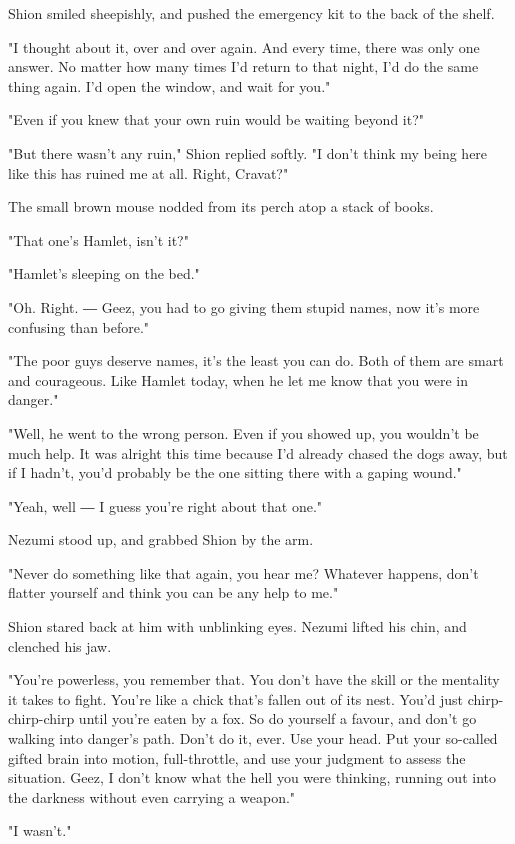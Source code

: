 Shion smiled sheepishly, and pushed the emergency kit to the back of the
shelf.

"I thought about it, over and over again. And every time, there was only
one answer. No matter how many times I'd return to that night, I'd do
the same thing again. I'd open the window, and wait for you."

"Even if you knew that your own ruin would be waiting beyond it?"

"But there wasn't any ruin," Shion replied softly. "I don't think my
being here like this has ruined me at all. Right, Cravat?"

The small brown mouse nodded from its perch atop a stack of books.

"That one's Hamlet, isn't it?"

"Hamlet's sleeping on the bed."

"Oh. Right. ― Geez, you had to go giving them stupid names, now it's
more confusing than before."

"The poor guys deserve names, it's the least you can do. Both of them
are smart and courageous. Like Hamlet today, when he let me know that
you were in danger."

"Well, he went to the wrong person. Even if you showed up, you wouldn't
be much help. It was alright this time because I'd already chased the
dogs away, but if I hadn't, you'd probably be the one sitting there with
a gaping wound."

"Yeah, well ― I guess you're right about that one."

Nezumi stood up, and grabbed Shion by the arm.

"Never do something like that again, you hear me? Whatever happens,
don't flatter yourself and think you can be any help to me."

Shion stared back at him with unblinking eyes. Nezumi lifted his chin,
and clenched his jaw.

"You're powerless, you remember that. You don't have the skill or the
mentality it takes to fight. You're like a chick that's fallen out of
its nest. You'd just chirp-chirp-chirp until you're eaten by a fox. So
do yourself a favour, and don't go walking into danger's path. Don't do
it, ever. Use your head. Put your so-called gifted brain into motion,
full-throttle, and use your judgment to assess the situation. Geez, I
don't know what the hell you were thinking, running out into the
darkness without even carrying a weapon."

"I wasn't."

